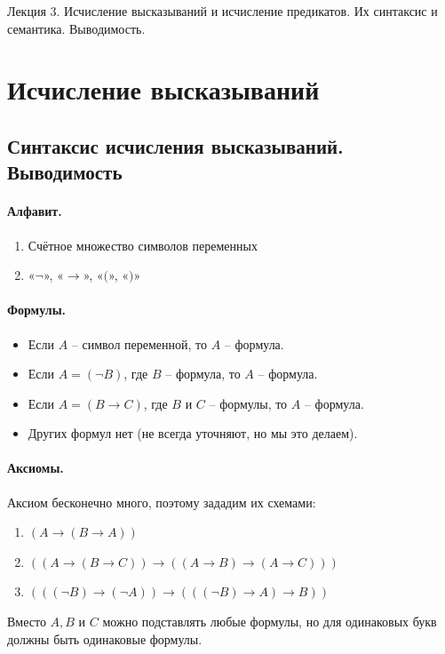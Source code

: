 \documentclass[11pt]{article}
\begin{document}
\begin{titlepage}
    \centering
    \vspace*{\fill}  %

    {\Huge Лекция 3. Исчисление высказываний и исчисление предикатов. Их синтаксис и семантика. Выводимость.
    \par}

    \vspace*{\fill}  %
\end{titlepage}

\setcounter{page}{1}

\section{Исчисление высказываний}

\subsection{Синтаксис исчисления высказываний. Выводимость}

\paragraph{Алфавит.} 
\begin{enumerate}
    \item Счётное множество символов переменных
    \item «$\lnot$», «$\to$», «$($», «$)$»
\end{enumerate}

\paragraph{Формулы.}
\begin{itemize}
    \item Если $A$ -- символ переменной, то $A$ -- формула.
    \item Если $A = (\lnot B)$, где $B$ -- формула, то $A$ -- формула.
    \item Если $A = (B \to C)$, где $B$ и $C$ -- формулы, то $A$ -- формула.
    \item Других формул нет (не всегда уточняют, но мы это делаем).
\end{itemize}

\paragraph{Аксиомы.} 
Аксиом бесконечно много, поэтому зададим их схемами:
\begin{enumerate}
    \item $(A \to (B \to A))$
    \item $((A \to (B \to C)) \to ((A \to B) \to (A \to C)))$
    \item $(((\lnot B) \to (\lnot A)) \to (((\lnot B) \to A) \to B))$
\end{enumerate}
Вместо $A, B$ и $C$ можно подставлять любые формулы, но для одинаковых букв 
должны быть одинаковые формулы.
\end{document}
